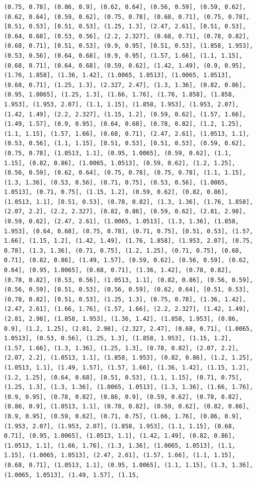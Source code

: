\documentclass[12pt,fleqn]{article}\usepackage{../common}
\begin{document}
\begin{verbatim}
(0.75, 0.78], (0.86, 0.9], (0.62, 0.64], (0.56, 0.59], (0.59, 0.62], (0.62, 0.64], (0.59, 0.62], (0.75, 0.78], (0.68, 0.71], (0.75, 0.78], [0.51, 0.53], [0.51, 0.53], (1.25, 1.3], (2.47, 2.61], [0.51, 0.53], (0.64, 0.68], (0.53, 0.56], (2.2, 2.327], (0.68, 0.71], (0.78, 0.82], (0.68, 0.71], [0.51, 0.53], (0.9, 0.95], [0.51, 0.53], (1.858, 1.953], (0.53, 0.56], (0.64, 0.68], (0.9, 0.95], (1.57, 1.66], (1.1, 1.15], (0.68, 0.71], (0.64, 0.68], (0.59, 0.62], (1.42, 1.49], (0.9, 0.95], (1.76, 1.858], (1.36, 1.42], (1.0065, 1.0513], (1.0065, 1.0513], (0.68, 0.71], (1.25, 1.3], (2.327, 2.47], (1.3, 1.36], (0.82, 0.86], (0.95, 1.0065], (1.25, 1.3], (1.66, 1.76], (1.76, 1.858], (1.858, 1.953], (1.953, 2.07], (1.1, 1.15], (1.858, 1.953], (1.953, 2.07], (1.42, 1.49], (2.2, 2.327], (1.15, 1.2], (0.59, 0.62], (1.57, 1.66], (1.49, 1.57], (0.9, 0.95], (0.64, 0.68], (0.78, 0.82], (1.2, 1.25], (1.1, 1.15], (1.57, 1.66], (0.68, 0.71], (2.47, 2.61], (1.0513, 1.1], (0.53, 0.56], (1.1, 1.15], [0.51, 0.53], [0.51, 0.53], (0.59, 0.62], (0.75, 0.78], (1.0513, 1.1], (0.95, 1.0065], (0.59, 0.62], (1.1, 1.15], (0.82, 0.86], (1.0065, 1.0513], (0.59, 0.62], (1.2, 1.25], (0.56, 0.59], (0.62, 0.64], (0.75, 0.78], (0.75, 0.78], (1.1, 1.15], (1.3, 1.36], (0.53, 0.56], (0.71, 0.75], (0.53, 0.56], (1.0065, 1.0513], (0.71, 0.75], (1.15, 1.2], (0.59, 0.62], (0.82, 0.86], (1.0513, 1.1], [0.51, 0.53], (0.78, 0.82], (1.3, 1.36], (1.76, 1.858], (2.07, 2.2], (2.2, 2.327], (0.82, 0.86], (0.59, 0.62], (2.81, 2.98], (0.59, 0.62], (2.47, 2.61], (1.0065, 1.0513], (1.3, 1.36], (1.858, 1.953], (0.64, 0.68], (0.75, 0.78], (0.71, 0.75], [0.51, 0.53], (1.57, 1.66], (1.15, 1.2], (1.42, 1.49], (1.76, 1.858], (1.953, 2.07], (0.75, 0.78], (1.3, 1.36], (0.71, 0.75], (1.2, 1.25], (0.71, 0.75], (0.68, 0.71], (0.82, 0.86], (1.49, 1.57], (0.59, 0.62], (0.56, 0.59], (0.62, 0.64], (0.95, 1.0065], (0.68, 0.71], (1.36, 1.42], (0.78, 0.82], (0.78, 0.82], (0.53, 0.56], (1.0513, 1.1], (0.82, 0.86], (0.56, 0.59], (0.56, 0.59], [0.51, 0.53], (0.56, 0.59], (0.62, 0.64], [0.51, 0.53], (0.78, 0.82], [0.51, 0.53], (1.25, 1.3], (0.75, 0.78], (1.36, 1.42], (2.47, 2.61], (1.66, 1.76], (1.57, 1.66], (2.2, 2.327], (1.42, 1.49], (2.81, 2.98], (1.858, 1.953], (1.36, 1.42], (1.858, 1.953], (0.86, 0.9], (1.2, 1.25], (2.81, 2.98], (2.327, 2.47], (0.68, 0.71], (1.0065, 1.0513], (0.53, 0.56], (1.25, 1.3], (1.858, 1.953], (1.15, 1.2], (1.57, 1.66], (1.3, 1.36], (1.25, 1.3], (0.78, 0.82], (2.07, 2.2], (2.07, 2.2], (1.0513, 1.1], (1.858, 1.953], (0.82, 0.86], (1.2, 1.25], (1.0513, 1.1], (1.49, 1.57], (1.57, 1.66], (1.36, 1.42], (1.15, 1.2], (1.2, 1.25], (0.64, 0.68], [0.51, 0.53], (1.1, 1.15], (0.71, 0.75], (1.25, 1.3], (1.3, 1.36], (1.0065, 1.0513], (1.3, 1.36], (1.66, 1.76], (0.9, 0.95], (0.78, 0.82], (0.86, 0.9], (0.59, 0.62], (0.78, 0.82], (0.86, 0.9], (1.0513, 1.1], (0.78, 0.82], (0.59, 0.62], (0.82, 0.86], (0.9, 0.95], (0.59, 0.62], (0.71, 0.75], (1.66, 1.76], (0.86, 0.9], (1.953, 2.07], (1.953, 2.07], (1.858, 1.953], (1.1, 1.15], (0.68, 0.71], (0.95, 1.0065], (1.0513, 1.1], (1.42, 1.49], (0.82, 0.86], (1.0513, 1.1], (1.66, 1.76], (1.3, 1.36], (1.0065, 1.0513], (1.1, 1.15], (1.0065, 1.0513], (2.47, 2.61], (1.57, 1.66], (1.1, 1.15], (0.68, 0.71], (1.0513, 1.1], (0.95, 1.0065], (1.1, 1.15], (1.3, 1.36], (1.0065, 1.0513], (1.49, 1.57], (1.15, 
\end{verbatim}
\end{document}
